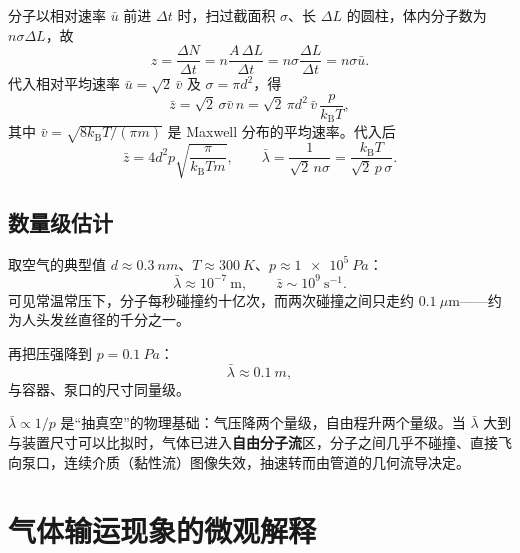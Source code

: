 \documentclass[11pt,a4paper,openany]{ctexbook}
\newcommand{\kBT}{k_{\mathrm B}T}
\begin{document}
\begin{center}
\end{center}

分子以相对速率 $\bar u$ 前进 $\Delta t$ 时，扫过截面积 $\sigma$、长 $\Delta L$ 的圆柱，体内分子数为 $n\sigma\Delta L$，故
\[
z=\frac{\Delta N}{\Delta t}
=n\frac{A\,\Delta L}{\Delta t}
=n\sigma\frac{\Delta L}{\Delta t}
=n\sigma\bar u .
\]
代入相对平均速率 $\bar u=\sqrt2\,\bar v$ 及 $\sigma=\pi d^2$，得
\[
\bar z=\sqrt2\,\sigma\bar v\,n
=\sqrt2\,\pi d^2\,\bar v\,\frac{p}{\kBT},
\]
其中 $\bar v=\sqrt{8\kBT/(\pi m)}$ 是 Maxwell 分布的平均速率。代入后
\[
\boxed{\bar z=4d^2p\sqrt{\frac{\pi}{\kBT m}}},
\qquad
\boxed{\bar\lambda=\frac{1}{\sqrt2\,n\sigma}
=\frac{\kBT}{\sqrt2\,p\,\sigma}} .
\]

\subsection*{数量级估计}

取空气的典型值 $d\approx\SI{0.3}{nm}$、$T\approx\SI{300}{K}$、$p\approx\SI{1e5}{Pa}$：
\[
\bar\lambda\approx10^{-7}\ \mathrm m,\qquad \bar z\sim10^{9}\ \mathrm{s^{-1}} .
\]
可见常温常压下，分子每秒碰撞约十亿次，而两次碰撞之间只走约 $0.1\ \mu\mathrm m$——约为人头发丝直径的千分之一。

再把压强降到 $p=\SI{0.1}{Pa}$：
\[
\bar\lambda\approx\SI{0.1}{m},
\]
与容器、泵口的尺寸同量级。

\begin{notebox}
$\bar\lambda\propto1/p$ 是“抽真空”的物理基础：气压降两个量级，自由程升两个量级。当 $\bar\lambda$ 大到与装置尺寸可以比拟时，气体已进入\textbf{自由分子流}区，分子之间几乎不碰撞、直接飞向泵口，连续介质（黏性流）图像失效，抽速转而由管道的几何流导决定。
\end{notebox}


\section{气体输运现象的微观解释}
\end{document}
